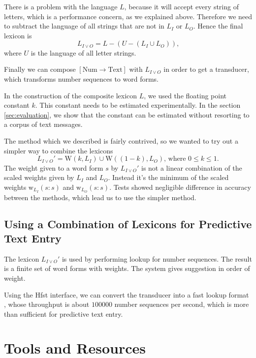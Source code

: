 \documentclass[a4paper,conference]{IEEEtran}
\begin{document}
There is a problem with the language $L$, because it will accept every
string of letters, which is a performance concern, as we explained
above. Therefore we need to subtract the language of all strings that
are not in $L_I$ or $L_O$. Hence the final lexicon is
\begin{equation}L_{I\vee O} = L - (U - (L_I \cup L_O))\text{,}\end{equation}
where $U$ is the language of all letter strings.

Finally we can compose $[\mathrm{Num}\rightarrow\mathrm{Text}]$ with
$L_{I\vee O}$ in order to get a transducer, which transforms number
sequences to word forms.

In the construction of the composite lexicon $L$, we used the floating
point constant $k$. This constant needs to be estimated
experimentally. In the section \ref{sec:evaluation}, we show that the
constant can be estimated without resorting to a corpus of text messages.

The method which we described is fairly contrived, so we wanted to try
out a simpler way to combine the lexicons
\begin{equation}
  L_{I\vee O}' = \mathrm{W}(k,L_I) \cup \mathrm{W}((1 - k),L_O)\text{, where }0 \leq k \leq 1\text{.}
\end{equation} 
The weight given to a word form $s$ by $L_{I\vee O}'$ is not a linear
combination of the scaled weights given by $L_I$ and $L_O$. Instead
it's the minimum of the scaled weights
$\mathrm{w}_{L_I}(s\mathrm{:}s)$ and $\mathrm{w}_{L_O}(s\mathrm{:}s)$.
Tests showed negligible difference in accuracy between the methods,
which lead us to use the simpler method.

\subsection{Using a Combination of Lexicons for Predictive Text Entry}

The lexicon $L_{I\vee O}'$ is used by performing lookup for number
sequences. The result is a finite set of word forms with weights. The
system gives suggestion in order of weight.

Using the Hfst interface, we can convert the transducer into a fast
lookup format \cite{conf/fsmnlp/Silfverberg2009}, whose throughput is
about $100000$ number sequences per second, which is more than
sufficient for predictive text entry.

\section{Tools and Resources}
\label{sec:tools}
\end{document}
